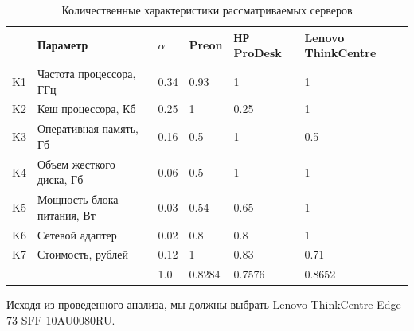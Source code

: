 \documentclass[russian,utf8,emptystyle]{eskdtext}
\begin{document}
\begin{longtable}{p{1cm}|p{7cm}|p{1cm}|p{2cm}|p{2cm}|p{2cm}}
\caption{Количественные характеристики рассматриваемых серверов}
\label{tab:server-4} \\
            & Параметр                     & $\alpha$ & Preon      & НР ProDesk & Lenovo ThinkCentre \\ 
\hline 
K1          & Частота процессора, ГГц      & 0.34     & 0.93       & 1          & 1        \\ 
K2          & Кеш процессора, Кб           & 0.25     & 1          & 0.25       & 1        \\
K3          & Оперативная память, Гб       & 0.16     & 0.5        & 1          & 0.5      \\ 
K4          & Объем жесткого диска, Гб     & 0.06     & 0.5        & 1          & 1        \\ 
K5          & Мощность блока питания, Вт   & 0.03     & 0.54       & 0.65       & 1        \\ 
K6          & Сетевой адаптер              & 0.02     & 0.8        & 0.8        & 1        \\ 
K7          & Стоимость, рублей            & 0.12     & 1          & 0.83       & 0.71     \\
\hline
            &                               & 1.0      & 0.8284     & 0.7576     & 0.8652
\end{longtable}

Исходя из проведенного анализа, мы должны выбрать Lenovo ThinkCentre Edge 73 SFF 10AU0080RU.
\end{document}
